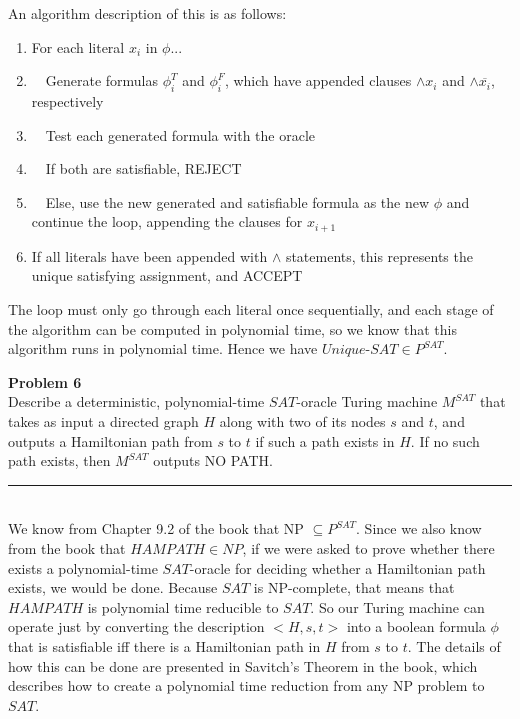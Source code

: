 \documentclass[paper=a4, fontsize=11pt]{scrartcl} %
\numberwithin{equation}{section} %
\numberwithin{figure}{section} %
\numberwithin{table}{section} %
\newcommand{\horrule}[1]{\rule{\linewidth}{#1}} %
\begin{document}
An algorithm description of this is as follows:

\begin{enumerate}
\item For each literal $x_i$ in $\phi$...
\item $ \ \ \ $ Generate formulas $\phi_i^{T}$ and $\phi_i^{F}$, which have appended clauses $\wedge x_i$ and $\wedge \overline{x_i}$, respectively
\item $ \ \ \ $ Test each generated formula with the oracle
\item $ \ \ \ $ If both are satisfiable, REJECT
\item $ \ \ \ $ Else, use the new generated and satisfiable formula as the new $\phi$ and continue the loop, appending the clauses for $x_{i+1}$
\item If all literals have been appended with $\wedge$ statements, this represents the unique satisfying assignment, and ACCEPT
\end{enumerate}

The loop must only go through each literal once sequentially, and each stage of the algorithm can be computed in polynomial time, so we know that this algorithm runs in polynomial time.  Hence we have $Unique$-$SAT \in P^{SAT}$.



\newpage



\textbf{Problem 6}
\\

Describe a deterministic, polynomial-time $SAT$-oracle Turing machine $M^{SAT}$ that takes as input a directed graph $H$ along with two of its nodes $s$ and $t$, and outputs a Hamiltonian path from $s$ to $t$ if such a path exists in $H$.  If no such path exists, then $M^{SAT}$ outputs NO PATH.

\horrule{1pt} 
\\

We know from Chapter 9.2 of the book that NP $\subseteq P^{SAT}$.  Since we also know from the book that $HAMPATH \in NP$, if we were asked to prove whether there exists a polynomial-time $SAT$-oracle for deciding whether a Hamiltonian path exists, we would be done.  Because $SAT$ is NP-complete, that means that $HAMPATH$ is polynomial time reducible to $SAT$.  So our Turing machine can operate just by converting the description $<H, s, t>$ into a boolean formula $\phi$ that is satisfiable iff there is a Hamiltonian path in $H$ from $s$ to $t$.  The details of how this can be done are presented in Savitch's Theorem in the book, which describes how to create a polynomial time reduction from any NP problem to $SAT$.\\
\end{document}
